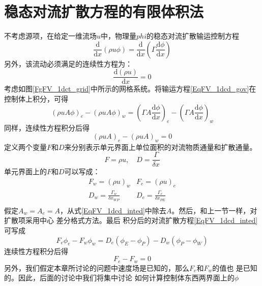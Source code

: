 \section{稳态对流扩散方程的有限体积法}
不考虑源项，在给定一维流场$u$中，物理量$phi$的稳态对流扩散输运控制方程
\begin{equation}
  \frac{\mathrm{d} }{\mathrm{d} x}(\rho u\phi)
  =
  \frac{\mathrm{d} }{\mathrm{d} x}
  \left(
    \Gamma \frac{\mathrm{d} \phi}{\mathrm{d} x}
    \right)
\label{EqFV_1dcd_gov}
\end{equation}
另外，该流动必须满足的连续性方程为：
\begin{equation}
  \frac{\mathrm{d} (\rho u)}{\mathrm{d} x}
  =
  0
\end{equation}
考虑如图\ref{FgFV_1dct_grid}中所示的网格系统。将输运方程\eqref{EqFV_1dcd_gov}在
控制体上积分，可得
\begin{equation}
  (\rho uA\phi)_{e}
  -
  (\rho uA\phi)_{w}
  =
  \left(
    \Gamma A\frac{\mathrm{d} \phi}{\mathrm{d} x}
  \right)_{e}
  -
  \left(
    \Gamma A\frac{\mathrm{d} \phi}{\mathrm{d} x}
  \right)_{w}
  \label{EqFV_1dcd_inted}
\end{equation}
同样，连续性方程积分后得
\begin{equation}
  (\rho uA)_{e} 
  -
  (\rho uA)_{w}
  =
  0
\end{equation}
定义两个变量$F$和$D$来分别表示单元界面上单位面积的对流物质通量和扩散通量。
\begin{equation}
F = \rho u , \quad D = \frac{\Gamma}{\delta x}
\end{equation}
单元界面上的$F$和$D$可以写成：
\begin{equation}
  \begin{matrix}
    F_{w}=(\rho u)_{w} & F_{e}=(\rho u)_{e} \\
    \displaystyle D_{w} = \frac{\Gamma_{w}}{\delta x_{WP}} & \displaystyle D_{e} = \frac{\Gamma_{e}}{\delta
    x_{PE}} \\
  \end{matrix}
\end{equation}
假定$A_{w}=A_{e}=A$，从式\eqref{EqFV_1dcd_inted}中除去$A$。然后，和上一节一样，对扩散项采用中心
差分格式方法。最后
积分后的对流扩散方程\eqref{EqFV_1dcd_inted}可写成
\begin{equation}
  F_{e}\phi_{e} - F_{w}\phi_{w}
  =
  D_{e}(\phi_{E}-\phi_{P})
  -
  D_{w}(\phi_{P}-\phi_{W})
  \label{EqFV_1dcd_dec}
\end{equation}
连续性方程积分后得
\begin{equation}
  F_{e} - F_{w} = 0
\end{equation}
另外，我们假定本章所讨论的问题中速度场是已知的，那么$F_{e}$和$F_{w}$的值也
是已知的。因此，后面的讨论中我们将集中讨论
如何计算控制体东西两界面上的$\phi$

